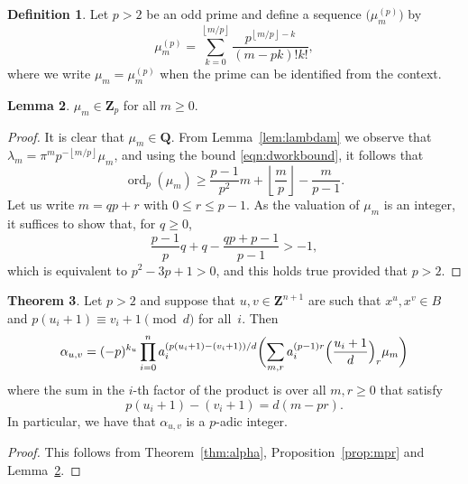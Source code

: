 \documentclass[a4paper,11pt]{article}
\numberwithin{equation}{section}
\providecommand{\floor}[1]{\left\lfloor#1\right\rfloor}   %
\newcommand{\ZZ}{\mathbf{Z}} %
\newcommand{\QQ}{\mathbf{Q}} %
\DeclareMathOperator{\ord}{ord}          %
\theoremstyle{definition}
\newtheorem{thm}{Theorem}[section]
\newtheorem{lem}[thm]{Lemma}
\newtheorem{defn}[thm]{Definition}
\begin{document}
\begin{defn}
Let $p >2$ be an odd prime and define a sequence 
$\bigl(\mu_m^{(p)}\bigr)$ by 
\begin{equation*}
\mu_m^{(p)} = \sum_{k=0}^{\floor{m/p}} \frac{p^{\floor{m/p} - k}}{(m-pk)! k!}, 
\end{equation*}
where we write $\mu_m = \mu_m^{(p)}$ when the prime can be identified 
from the context.
\end{defn}

\begin{lem} \label{lem:mup}
$\mu_m \in \ZZ_p$ for all $m \geq 0$.
\end{lem}

\begin{proof}
It is clear that $\mu_m \in \QQ$.  From Lemma~\ref{lem:lambdam} 
we observe that $\lambda_m = \pi^m p^{- \floor{m/p}} \mu_m$, and 
using the bound \eqref{eqn:dworkbound}, it follows that 
\begin{equation*}
\ord_p (\mu_m) \geq \frac{p-1}{p^2} m + \floor{\frac{m}{p}} - \frac{m}{p-1}.
\end{equation*}
Let us write $m = q p + r$ with $0 \leq r \leq p-1$.  As the valuation 
of $\mu_m$ is an integer, it suffices to show that, for $q \geq 0$, 
\begin{equation*}
\frac{p-1}{p} q + q - \frac{q p + p - 1}{p - 1} > -1,
\end{equation*}
which is equivalent to $p^2 - 3p + 1 > 0$, and this holds true 
provided that $p > 2$.
\end{proof}

\begin{thm} \label{thm:alphap}
Let $p > 2$ and suppose that $u, v \in \ZZ^{n+1}$ are such 
that $x^u, x^v \in B$ and 
$p (u_i + 1) \equiv v_i + 1 \pmod{d}$ for all~$i$. Then 
\begin{equation*}
\alpha_{u,v} = (-p)^{k_u} \prod_{i=0}^n 
    a_i^{(p (u_i + 1) - (v_i + 1))/d} \biggl( \sum_{m,r} a_i^{(p-1)r}
    \Bigl(\frac{u_i+1}{d}\Bigr)_r \mu_m \biggr)
\end{equation*}
where the sum in the $i$-th factor of the product is over all $m, r \geq 0$  
that satisfy
\[
p(u_i+1)-(v_i+1)=d(m-pr).
\]
In particular, we have that $\alpha_{u, v}$ is a $p$-adic integer. 
\end{thm}

\begin{proof}
This follows from Theorem~\ref{thm:alpha}, Proposition~\ref{prop:mpr} 
and Lemma~\ref{lem:mup}.
\end{proof}
\end{document}
